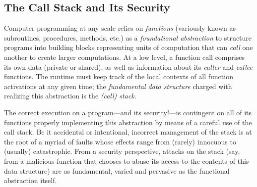 \subsection{The Call Stack and Its Security}


Computer programming at any scale relies on \emph{functions} (variously known as
subroutines, procedures, methods, etc.) as a \emph{foundational abstraction} to
structure programs into building blocks representing units of computation that
can \emph{call} one another to create larger computations.
%
At a low level, a function call comprises its own data (private or shared), as
well as information about its \emph{caller} and \emph{callee} functions. The
runtime must keep track of the local contexts of all function activations
at any given time; the \emph{fundamental data structure} charged with realizing
this abstraction is the \emph{(call) stack}.
%

The correct execution on a program---and its security!---is contingent on all of
its functions properly implementing this abstraction by means of a careful use
of the call stack. Be it accidental or intentional, incorrect management of the
stack is at the root of a myriad of faults whose effects range from (rarely)
innocuous to (usually) catastrophic.
%
From a security perspective, attacks on the stack (say, from a malicious
function that chooses to abuse its access to the contents of this data
structure) are as fundamental, varied and pervasive as the functional
abstraction itself.
%


